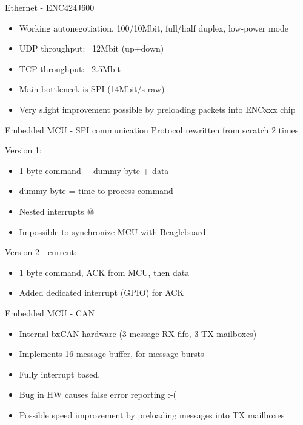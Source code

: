 \documentclass{beamer}
\begin{document}
\begin{frame}{Ethernet - ENC424J600}
\begin{itemize}
	\item Working autonegotiation, 100/10Mbit, full/half duplex, low-power mode
	\item UDP throughput: ~12Mbit (up+down) 
	\item TCP throughput: ~2.5Mbit
\end{itemize}

\begin{itemize}
  \item Main bottleneck is SPI (14Mbit/s raw)
	\item Very slight improvement possible by preloading packets into ENCxxx chip
\end{itemize}
\end{frame}

\begin{frame}{Embedded MCU - SPI communication}
Protocol rewritten from scratch 2 times

Version 1:
\begin{itemize}
	\item 1 byte command + dummy byte + data
	\item dummy byte = time to process command
	\item Nested interrupts \(\skull\)
	\item Impossible to synchronize MCU with Beagleboard.
\end{itemize}

Version 2 - current:
\begin{itemize}
\item 1 byte command, ACK from MCU, then data
\item Added dedicated interrupt (GPIO) for ACK
\end{itemize}
\end{frame}

\begin{frame}{Embedded MCU - CAN}
\begin{itemize}
	\item Internal bxCAN hardware (3 message RX fifo, 3 TX mailboxes)
  \item Implements 16 message buffer, for message bursts 
	\item Fully interrupt based.
\end{itemize}

\begin{itemize}
\item Bug in HW causes false error reporting :-(
\item Possible speed improvement by preloading messages into TX mailboxes 
\end{itemize}
\end{frame}
\end{document}
